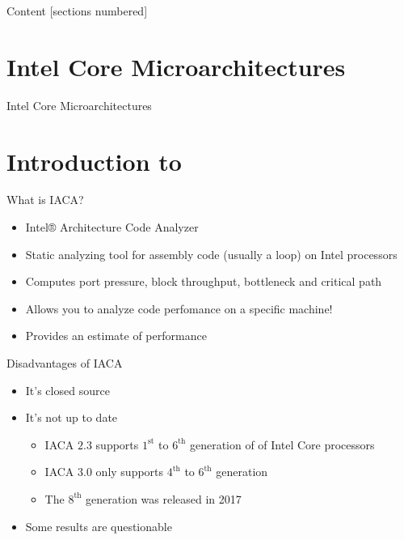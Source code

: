 \documentclass[10pt, tikz,border=2mm, xcolor=dvipsnames]{beamer}
\title{\suaca}
\subtitle{Bachelor talk}
\date{July 26, 2018}
\author{Hendrik Meerkamp}
\institute{}
\begin{document}
    
    \maketitle
    
\begin{frame}{Content}
    [sections numbered]
    \tableofcontents[hideallsubsections]
\end{frame}

\section{Intel Core Microarchitectures}

\begin{frame}{Intel Core Microarchitectures}
    
\end{frame}

\section{Introduction to \iaca}


\begin{frame}{What is IACA?}
\begin{itemize}[<+- | alert@+>]
    \item Intel® Architecture Code Analyzer
    \item Static analyzing tool for assembly code (usually a loop) on Intel processors
    \item Computes port pressure, block throughput, bottleneck and critical path
    \item Allows you to analyze code perfomance on a specific machine!
    \item Provides an estimate of performance
\end{itemize}
\end{frame}

\begin{frame}[fragile]{Disadvantages of IACA}
\begin{itemize}[<+- | alert@+>]
    \item It's closed source
    \item It's not up to date
    \begin{itemize}[<+- | alert@+>]
        \item IACA $2.3$ supports $1^{\text{st}}$ to $6^{\text{th}}$ generation of of Intel Core processors
        \item IACA $3.0$ only supports $4^{\text{th}}$ to $6^{\text{th}}$ generation
        \item The $8^{\text{th}}$ generation was released in 2017
    \end{itemize}
    \item Some results are questionable
\end{itemize}
\end{frame}
\end{document}
